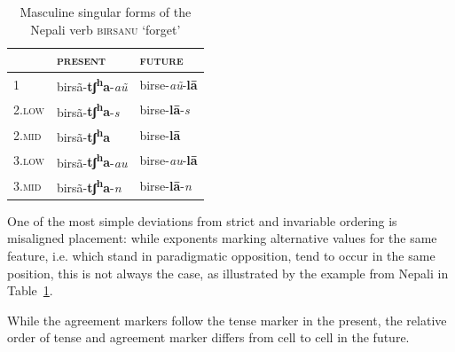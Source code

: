 \begin{table}[ht!]
  \begin{center}
    \begin{tabular}{lll}
      \toprule
      & \textsc{present} & \textsc{future}\\
      \midrule
      1 & birsã-\textbf{tʃ\textsuperscript{h}a}-\emph{aũ} & 
                                                                birse-\emph{aũ}-\textbf{lā}\\
      \textsc{2.low} &
                 birsã-\textbf{tʃ\textsuperscript{h}a}-\emph{s} & 
                                                                      birse-\textbf{lā}-\emph{s}\\
      \textsc{2.mid} & 
                  birsã-\textbf{tʃ\textsuperscript{h}a} & 
                                                         birse-\textbf{lā}\\
      \textsc{3.low} & 
                  birsã-\textbf{tʃ\textsuperscript{h}a}-\emph{au} & 
                                                                        birse-\emph{au}-\textbf{lā}\\
      \textsc{3.mid} &
                 birsã-\textbf{tʃ\textsuperscript{h}a}-\emph{n} & 
                                                                      birse-\textbf{lā}-\emph{n}\\
      \bottomrule
    \end{tabular}
  \end{center}
  \caption{Masculine singular forms of the Nepali verb \textsc{birsanu} ‘forget’}
  \label{tab:Nepali}
\end{table}

One of the most simple deviations from strict and invariable ordering
is misaligned placement: while exponents marking alternative values
for the same feature, i.e. which stand in paradigmatic opposition,
tend to occur in the same position, this is not always the case, as
illustrated by the example from Nepali in Table~\ref{tab:Nepali}.     


While the agreement markers follow the tense marker in the present,
the relative order of tense and agreement marker differs from cell to
cell in the future.

